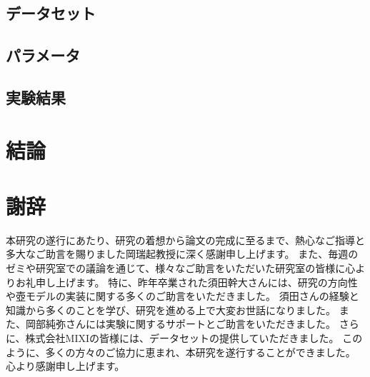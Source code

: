 \documentclass[uplatex,11pt,openany]{ujreport}
\renewcommand{\bibname}{参考文献}
\begin{document}
    \section{データセット}
    \section{パラメータ}
    \section{実験結果}


\chapter{結論}



\chapter*{謝辞}
本研究の遂行にあたり、研究の着想から論文の完成に至るまで、熱心なご指導と多大なご助言を賜りました岡瑞起教授に深く感謝申し上げます。
また、毎週のゼミや研究室での議論を通じて、様々なご助言をいただいた研究室の皆様に心よりお礼申し上げます。
特に、昨年卒業された須田幹大さんには、研究の方向性や壺モデルの実装に関する多くのご助言をいただきました。
須田さんの経験と知識から多くのことを学び、研究を進める上で大変お世話になりました。
また、岡部純弥さんには実験に関するサポートとご助言をいただきました。
さらに、株式会社MIXIの皆様には、データセットの提供していただきました。
このように、多くの方々のご協力に恵まれ、本研究を遂行することができました。
心より感謝申し上げます。


\newpage


% 
% 





\end{document}
